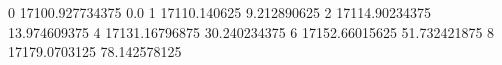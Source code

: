 0 17100.927734375 0.0
1 17110.140625 9.212890625
2 17114.90234375 13.974609375
4 17131.16796875 30.240234375
6 17152.66015625 51.732421875
8 17179.0703125 78.142578125
